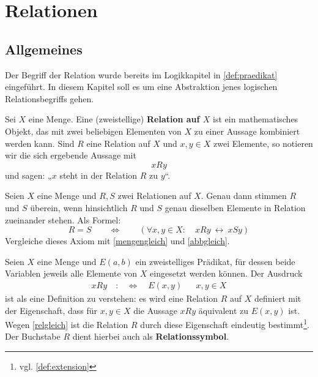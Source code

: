 



\chapter{Relationen}


\section{Allgemeines}


Der Begriff der Relation wurde bereits im Logikkapitel in \cref{def:praedikat} eingeführt. In diesem Kapitel soll es um eine Abstraktion jenes logischen Relationsbegriffs gehen.


\begin{de} \label{def:relation} 
    Sei $X$ eine Menge. Eine (zweistellige) \textbf{Relation auf $X$} ist ein mathematisches Objekt, das mit zwei beliebigen Elementen von $X$ zu einer Aussage kombiniert werden kann. Sind $R$ eine Relation auf $X$ und $x,y\in X$ zwei Elemente, so notieren wir die sich ergebende Aussage mit
        \[ xRy \]
    und sagen: „$x$ steht in der Relation $R$ zu $y$“.
\end{de}


\begin{axiom} \label{relgleich}
    Seien $X$ eine Menge und $R,S$ zwei Relationen auf $X$. Genau dann stimmen $R$ und $S$ überein, wenn hinsichtlich $R$ und $S$ genau dieselben Elemente in Relation zueinander stehen. Als Formel:
        \[ R=S \qquad\Leftrightarrow\qquad (\forall x,y\in X:\quad xRy\ \leftrightarrow\ xSy) \]
    Vergleiche dieses Axiom mit \cref{mengengleich} und \cref{abbgleich}.
\end{axiom}


\begin{nota}
    Seien $X$ eine Menge und $E(a,b)$ ein zweistelliges Prädikat, für dessen beide Variablen jeweils alle Elemente von $X$ eingesetzt werden können. Der Ausdruck
    \begin{align*}
        xRy \quad :&\Leftrightarrow\quad E(x,y) && x,y\in X
    \end{align*}
    ist als eine Definition zu verstehen: es wird eine Relation $R$ auf $X$ definiert mit der Eigenschaft, dass für $x,y\in X$ die Aussage $xRy$ äquivalent zu $E(x,y)$ ist. Wegen \cref{relgleich} ist die Relation $R$ durch diese Eigenschaft eindeutig bestimmt\footnote{vgl. \cref{def:extension}}. Der Buchstabe $R$ dient hierbei auch als \textbf{Relationssymbol}.
\end{nota}


